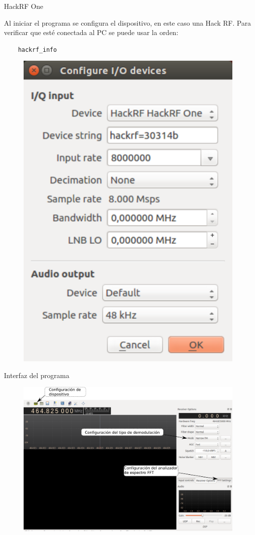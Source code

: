 \begin{frame}{HackRF One}

Al iniciar el programa se configura el dispositivo, en este caso una Hack RF. Para verificar que esté conectada al PC se puede usar la orden:

\begin{block}{}
  \texttt{
  \ \ \ hackrf\_info}
\end{block}

\begin{figure}[H]
\centering
\vspace{-3mm}
\includegraphics[width=.3\textwidth]{parte3/lab10/pdf/lab10_4.pdf}
\end{figure}

\end{frame}

\begin{frame}{Interfaz del programa}

\begin{figure}[H]
\centering
\vspace{-3mm}
\includegraphics[width=.9\textwidth]{parte3/lab10/pdf/lab10_5.pdf}
\end{figure}

\end{frame}

